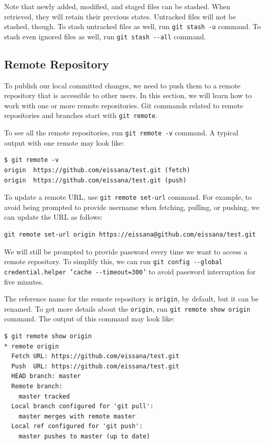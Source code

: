 \documentclass[11pt]{article}
\begin{document}
Note that newly added, modified, and staged files can be stashed. When retrieved, they will retain their previous states. Untracked files will not be stashed, though. To stash untracked files as well, run \texttt{git stash -u} command. To stash even ignored files as well, run \texttt{git stash -{}-all} command.

\subsection{\label{orgtarget7} Remote Repository}
\label{sec:orgheadline14}
To publish our local committed changes, we need to push them to a remote repository that is accessible to other users. In this section, we will learn how to work with one or more remote repositories. Git commands related to remote repositories and branches start with \texttt{git remote}.

To see all the remote repositories, run \texttt{git remote -v} command. A typical output with one remote may look like:
\begin{verbatim}
$ git remote -v
origin  https://github.com/eissana/test.git (fetch)
origin  https://github.com/eissana/test.git (push)
\end{verbatim}

To update a remote URL, use \texttt{git remote set-url} command. For example, to avoid being prompted to provide username when fetching, pulling, or pushing, we can update the URL as follows:
\begin{verbatim}
git remote set-url origin https://eissana@github.com/eissana/test.git
\end{verbatim}
We will still be prompted to provide password every time we want to access a remote repository. To simplify this, we can run \texttt{git config -{}-global credential.helper 'cache -{}-timeout=300'} to avoid password interruption for five minutes.

The reference name for the remote repository is \texttt{origin}, by default, but it can be renamed. To get more details about the \texttt{origin}, run \texttt{git remote show origin} command. The output of this command may look like:
\begin{verbatim}
$ git remote show origin
* remote origin
  Fetch URL: https://github.com/eissana/test.git
  Push  URL: https://github.com/eissana/test.git
  HEAD branch: master
  Remote branch:
    master tracked
  Local branch configured for 'git pull':
    master merges with remote master
  Local ref configured for 'git push':
    master pushes to master (up to date)
\end{verbatim}
\end{document}
